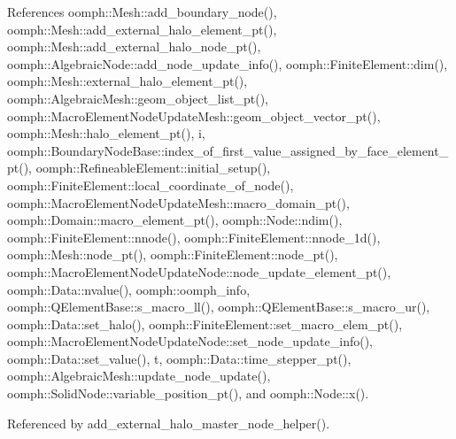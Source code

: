 References oomph\+::\+Mesh\+::add\+\_\+boundary\+\_\+node(), oomph\+::\+Mesh\+::add\+\_\+external\+\_\+halo\+\_\+element\+\_\+pt(), oomph\+::\+Mesh\+::add\+\_\+external\+\_\+halo\+\_\+node\+\_\+pt(), oomph\+::\+Algebraic\+Node\+::add\+\_\+node\+\_\+update\+\_\+info(), oomph\+::\+Finite\+Element\+::dim(), oomph\+::\+Mesh\+::external\+\_\+halo\+\_\+element\+\_\+pt(), oomph\+::\+Algebraic\+Mesh\+::geom\+\_\+object\+\_\+list\+\_\+pt(), oomph\+::\+Macro\+Element\+Node\+Update\+Mesh\+::geom\+\_\+object\+\_\+vector\+\_\+pt(), oomph\+::\+Mesh\+::halo\+\_\+element\+\_\+pt(), i, oomph\+::\+Boundary\+Node\+Base\+::index\+\_\+of\+\_\+first\+\_\+value\+\_\+assigned\+\_\+by\+\_\+face\+\_\+element\+\_\+pt(), oomph\+::\+Refineable\+Element\+::initial\+\_\+setup(), oomph\+::\+Finite\+Element\+::local\+\_\+coordinate\+\_\+of\+\_\+node(), oomph\+::\+Macro\+Element\+Node\+Update\+Mesh\+::macro\+\_\+domain\+\_\+pt(), oomph\+::\+Domain\+::macro\+\_\+element\+\_\+pt(), oomph\+::\+Node\+::ndim(), oomph\+::\+Finite\+Element\+::nnode(), oomph\+::\+Finite\+Element\+::nnode\+\_\+1d(), oomph\+::\+Mesh\+::node\+\_\+pt(), oomph\+::\+Finite\+Element\+::node\+\_\+pt(), oomph\+::\+Macro\+Element\+Node\+Update\+Node\+::node\+\_\+update\+\_\+element\+\_\+pt(), oomph\+::\+Data\+::nvalue(), oomph\+::oomph\+\_\+info, oomph\+::\+Q\+Element\+Base\+::s\+\_\+macro\+\_\+ll(), oomph\+::\+Q\+Element\+Base\+::s\+\_\+macro\+\_\+ur(), oomph\+::\+Data\+::set\+\_\+halo(), oomph\+::\+Finite\+Element\+::set\+\_\+macro\+\_\+elem\+\_\+pt(), oomph\+::\+Macro\+Element\+Node\+Update\+Node\+::set\+\_\+node\+\_\+update\+\_\+info(), oomph\+::\+Data\+::set\+\_\+value(), t, oomph\+::\+Data\+::time\+\_\+stepper\+\_\+pt(), oomph\+::\+Algebraic\+Mesh\+::update\+\_\+node\+\_\+update(), oomph\+::\+Solid\+Node\+::variable\+\_\+position\+\_\+pt(), and oomph\+::\+Node\+::x().



Referenced by add\+\_\+external\+\_\+halo\+\_\+master\+\_\+node\+\_\+helper().

\mbox{\label{namespaceoomph_1_1Missing__masters__functions_ae60b3fe43b4c8a9ccd03d2bc22f437c6}} 
